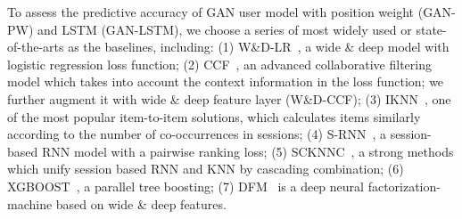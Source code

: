 \documentclass{article} %
\newcommand{\xc}[1]{{\color{blue}{\bf\sf #1}}}
\begin{document}
To assess the predictive accuracy of GAN user model with position weight (GAN-PW) and LSTM (GAN-LSTM), we choose a series of most widely used or state-of-the-arts as the baselines, including: (1) W\&D-LR~\citep{ChengKocHarmsen16}, a wide \& deep model with logistic regression loss function; (2) CCF~\citep{YanLonSmoEtal11b}, an advanced collaborative filtering model which takes into account the context information in the loss function; we further augment it with wide \& deep feature layer (W\&D-CCF); (3) IKNN~\citep{hidasi2015session}, one of the most popular item-to-item solutions, which calculates items similarly according to the number of co-occurrences in sessions; (4) S-RNN~\citep{HidKarBalTik16}, a session-based RNN model with a pairwise ranking loss; (5) SCKNNC~\citep{jannach2017recurrent}, a strong methods which unify session based RNN and KNN by cascading combination; (6) XGBOOST~\citep{chen2016xgboost}, a parallel tree boosting; (7) DFM~\citep{guo2017deepfm} is a deep neural factorization-machine based on wide \& deep features.

\end{document}
